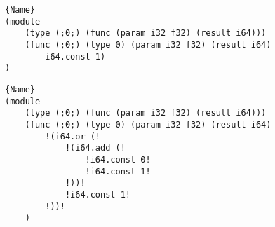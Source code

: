 \begin{minipage}{0.9\linewidth}


   \begin{minipage}[b]{\linewidth}
    \lstset{
        language=WAT,
                        style=watcode,
        basicstyle=\footnotesize\ttfamily,
                        columns=fullflexible,
                        breaklines=true}
        
        \begin{lstlisting}[label=example:peeporig,caption={Wasm function.},frame=b, captionpos=b]{Name}
(module
    (type (;0;) (func (param i32 f32) (result i64)))
    (func (;0;) (type 0) (param i32 f32) (result i64)
        i64.const 1)
)
        \end{lstlisting}
\end{minipage}


\begin{minipage}[b]{\linewidth}
    \lstset{
        language=WAT,
                        style=watcode,
        basicstyle=\footnotesize\ttfamily,
                        columns=fullflexible,
                        breaklines=true}
        
        \begin{lstlisting}[label=example:peepapplied,caption={Random peephole mutation using egraph traversal for \autoref{example:peeporig} over e-graph \autoref{e-graph3}. The textual format is folded for better understanding.},frame=b, captionpos=b]{Name}
(module
    (type (;0;) (func (param i32 f32) (result i64)))
    (func (;0;) (type 0) (param i32 f32) (result i64)
        !(i64.or (!
            !(i64.add (!
                !i64.const 0!
                !i64.const 1!
            !))!
            !i64.const 1!
        !))!
    )
        \end{lstlisting}
\end{minipage}

\end{minipage}
